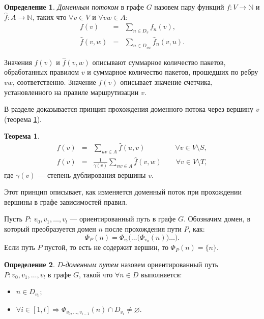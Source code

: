 \documentclass[14pt,autoref,href]{disser}
\theoremstyle{definition}
\newtheorem{definition}{Определение}
\newtheorem{theorem}{Теорема}
\begin{document}
\begin{definition}
\textit{Доменным потоком} в графе $G$ назовем пару функций $f:V\rightarrow \mathbb{N}$ и $\hat{f}:A\rightarrow \mathbb{N}$, таких что $\forall v\in V$ и $\forall vw\in A$:
\begin{eqnarray}
    f(v) & = & \sum_{n\in D_v} {f_n(v)} \label{eq:f(v)}, \\
    \hat{f}(v,w) & = & \sum_{n\in D_{vw}} {\hat{f}_n(v,u)} \label{eq:f(vw)}.
\end{eqnarray}
\end{definition}

Значения $f(v)$ и $\hat{f}(v,w)$ описывают суммарное количество пакетов, обработанных правилом $v$ и суммарное количество пакетов, прошедших по ребру $vw$, соответственно.
Значение $f(v)$ описывает значение счетчика, установленного на правиле маршрутизации $v$.

В разделе доказывается принцип прохождения доменного потока через вершину $v$ (теорема \ref{th:cons}).
\begin{theorem} \label{th:cons}
\begin{eqnarray}
    f(v) & = & \sum_{uv\in A} {\hat{f}(u,v)}\qquad\qquad\ \forall v\in V\setminus S \label{eq:cons_in}, \\
    f(v) & = & \frac{1}{\gamma(v)} \sum_{vw\in A} {\hat{f}(v,w)}\qquad \forall v\in V\setminus T \label{eq:cons_out},
\end{eqnarray}
где $\gamma(v)$ --- степень дублирования вершины $v$.
\end{theorem}
Этот принцип описывает, как изменяется доменный поток при прохождении вершины в графе зависимостей правил.

Пусть $P:\ v_0,v_1,\dots,v_l$ --- ориентированный путь в графе $G$.
Обозначим домен, в который преобразуется домен $n$ после прохождения пути $P$, как:
\begin{equation} \label{eq:n_P}
    \Phi_{P}(n)
    =
    \Phi_{v_l}\Big(\dots\big(\Phi_{v_0}(n)\big)\dots\Big).
\end{equation}
Если путь $P$ пустой, то есть не содержит вершин, то $\Phi_{P}(n) = \{n\}$.

\begin{definition}
$D$-\textit{доменным путем} назовем ориентированный путь $P:v_0,v_1,\dots,v_l$ в графе $G$, такой что $\forall n\in D$ выполняется:
\begin{itemize}
\item $n\in D_{v_0}$;
\item $\forall i\in [1,l] \Rightarrow \Phi_{v_0,\dots,v_{i-1}}(n)\cap D_{v_i}\neq \varnothing$.
\end{itemize}
\end{definition}
\end{document}
